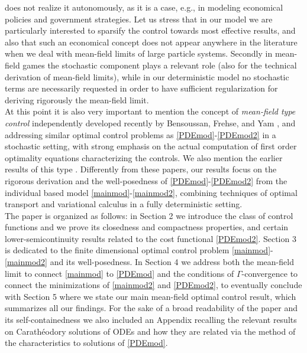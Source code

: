 \documentclass[11pt]{article}
\theoremstyle{plain}
\theoremstyle{definition}
\theoremstyle{remark}
\numberwithin{equation}{section}
\begin{document}
does not realize it autonomously, as it is a case, e.g., in modeling economical policies and government strategies.
Let us stress that in our model we are particularly interested to sparsify the control towards most effective results, and also that such an economical concept does not appear anywhere in the literature
when we deal with mean-field limits of large particle systems.
Secondly in mean-field games the stochastic component plays a relevant role (also for the technical derivation of mean-field limits), while in our deterministic model no stochastic terms are
necessarily requested in order to have sufficient regularization for deriving rigorously the mean-field limit. \\
At this point it is also very important to mention the concept of {\it mean-field type control} independently developed recently  by  Bensoussan, Frehse, and Yam \cite{befrph13}, and addressing similar 
optimal control problems as \eqref{PDEmod}-\eqref{PDEmod2} in a stochastic setting, with strong emphasis on the actual computation of first order optimality equations characterizing the controls. We also mention the 
earlier results of this type \cite{ahdi01,addj11,budjli11}. Differently from these papers, our results  focus on the rigorous derivation and the well-posedness of \eqref{PDEmod}-\eqref{PDEmod2} from the individual based model \eqref{mainmod}-\eqref{mainmod2}, combining techniques of optimal transport and variational calculus in a fully deterministic setting.
\\

The paper is organized as follows: in Section 2 we introduce the class of control functions and we prove its closedness and compactness properties, and certain lower-semicontinuity results related to the cost functional
\eqref{PDEmod2}. Section 3 is dedicated to the finite dimensional optimal control problem \eqref{mainmod}-\eqref{mainmod2} and its well-posedness. In Section 4 we address both the mean-field limit 
to connect \eqref{mainmod} to \eqref{PDEmod} and the conditions of $\Gamma$-convergence to connect the minimizations of \eqref{mainmod2} and \eqref{PDEmod2}, to eventually conclude with Section 5 where
we state our main mean-field optimal control result, which summarizes all our findings. For the sake of a broad readability of the paper and its self-containedness we also included an Appendix recalling the relevant results on Carath{\'e}odory solutions of ODEs and how
they are related via the method of the characteristics to solutions of \eqref{PDEmod}. 
\end{document}
